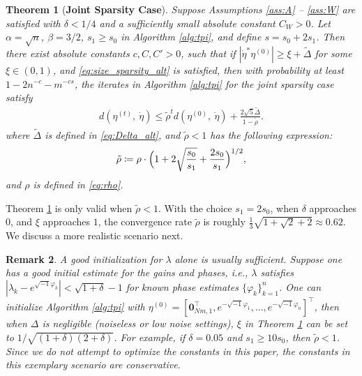 \documentclass[11pt,journal]{IEEEtran}
\newcommand{\T}{\top}
\newtheorem{theorem}{Theorem}[section]
\newtheorem{remark}[theorem]{Remark}
\begin{document}
\begin{theorem}[\textbf{Joint Sparsity Case}] \label{thm:tpi_alt}
Suppose Assumptions \ref{ass:A} -- \ref{ass:W} are satisfied with $\delta < 1/4$ and a sufficiently small absolute constant $C_W > 0$. Let $\alpha =\sqrt{n}$, $\beta = 3/2$, $s_1\geq s_0$ in Algorithm \ref{alg:tpi}, and define $s=s_0+2s_1$. Then there exist absolute constants $c,C,C' > 0$, such that if $|\dot{\eta}^*\eta^{(0)}|\geq \xi + \widetilde{\Delta}$ for some $\xi\in(0,1)$, and \eqref{eq:size_sparsity_alt} is satisfied, then with probability at least $1-2n^{-c} - m^{-cs}$, the iterates in Algorithm \ref{alg:tpi} for the \emph{joint} sparsity case satisfy
\begin{align*}
d(\eta^{(t)},~\dot{\eta}) \leq \tilde{\rho}^t
d(\eta^{(0)},~\dot{\eta}) + \frac{2\sqrt{5}\widetilde{\Delta}}{1-\tilde{\rho}}.
\end{align*}
where $\widetilde{\Delta}$ is defined in \eqref{eq:Delta_alt}, and $\tilde{\rho} < 1$ has the following expression:
\begin{align}
\tilde{\rho} \coloneqq \rho \cdot \Bigl(1 + 2\sqrt{\frac{s_0}{s_1}} + \frac{2s_0}{s_1}\Bigr)^{1/2}, \label{eq:rho_tilde}
\end{align}
and $\rho$ is defined in \eqref{eq:rho}.
\end{theorem}


Theorem \ref{thm:tpi_alt} is only valid when $\tilde{\rho} < 1$. With the choice $s_1 = 2s_0$, when $\delta$ approaches $0$, and $\xi$ approaches $1$, the convergence rate $\tilde{\rho}$ is roughly $\frac{1}{3}\sqrt{1 + \sqrt{2} + 2} \approx 0.62$. We discuss a more realistic scenario next. 

\begin{remark} \label{rem:initialize}
A good initialization for $\lambda$ alone is usually sufficient. Suppose one has a good initial estimate for the gains and phases, i.e., $\lambda$ satisfies $|\lambda_k - e^{\sqrt{-1}\varphi_k}| < \sqrt{1+\delta}-1$ for known phase estimates $\{\varphi_k\}_{k=1}^n$. One can initialize Algorithm \ref{alg:tpi} with $\eta^{(0)} = [\bm{0}_{Nm,1}^\T, e^{-\sqrt{-1}\varphi_1},\dots, e^{-\sqrt{-1}\varphi_n}]^\T$, then when $\Delta$ is negligible (noiseless or low noise settings), $\xi$ in Theorem \ref{thm:tpi_alt} can be set to $1/\sqrt{(1+\delta)(2+\delta)}$. For example, if $\delta = 0.05$ and $s_1 \geq 10 s_0$, then $\tilde{\rho}<1$.
Since we do not attempt to optimize the constants in this paper, the constants in this exemplary scenario are conservative. 
\end{remark}
\end{document}
